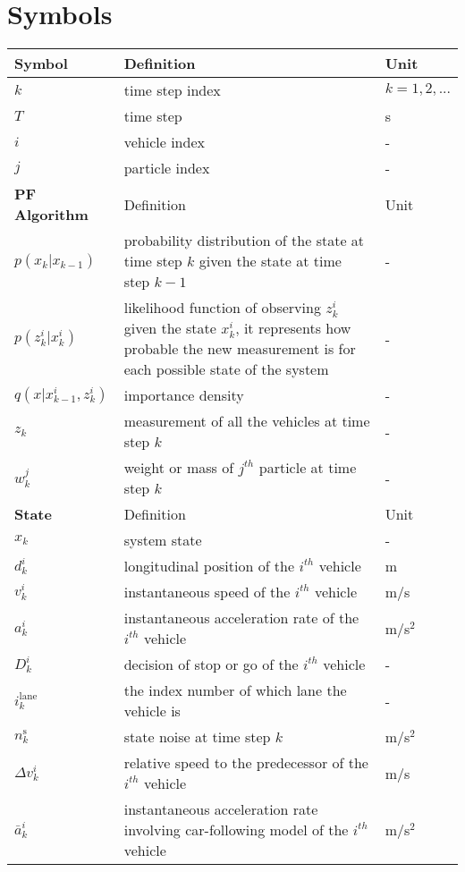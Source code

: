\section*{Symbols}
\begin{longtable}{p{2.5cm}p{10cm}p{2.5cm}}
    \toprule
    Symbol & Definition & Unit \\
    \midrule\endhead %
    $k$ & time step index & $k = 1, 2, ...$ \\
    $T$ & time step & s \\
    $i$ & vehicle index & - \\
    $j$ & particle index & - \\
    \toprule
    \textbf{PF Algorithm}  & Definition & Unit \\
    \midrule
    $p(x_k | x_{k-1})$ & probability distribution of the state at time step $k$ given the state at time step $k-1$ & - \\
    $p(z_k^{i} | x_k^{i})$ & likelihood function of observing $z_k^{i}$ given the state $x_k^{i}$, it represents how probable the new measurement is for each possible state of the system  & - \\
    $q(x|x_{k-1}^{i},z_k^i)$ & importance density & - \\
    $z_k$  &  measurement of all the vehicles at time step $k$ & - \\
    $w_k^{j}$ & weight or mass of $j^{th}$ particle at time step $k$ & - \\
    \toprule
    \textbf{State}  & Definition & Unit \\
    \midrule
    $x_k$ & system state & - \\
    $d_k^i$  & longitudinal position of the $i^{th}$ vehicle & m \\
    $v_k^i$  & instantaneous speed of the $i^{th}$ vehicle & m/s \\
    $a_k^i$  & instantaneous acceleration rate of the $i^{th}$ vehicle & m/s$^2$ \\
    $D_{k}^i$ & decision of stop or go of the $i^{th}$ vehicle & - \\
    $i_k^{\text{lane}}$ & the index number of which lane the vehicle is & -\\
    $n_k^\text{s}$  & state noise at time step $k$ & m/s$^2$ \\
    $\Delta v_k^i$ & relative speed to the predecessor of the $i^{th}$ vehicle & m/s \\
    $\bar a_k^i$  & instantaneous acceleration rate involving car-following model of the $i^{th}$ vehicle & m/s$^2$ \\

\end{longtable}
